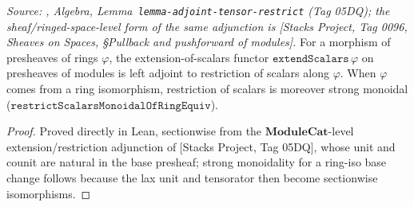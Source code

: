 \begin{lemma}
  \label{lem:extend_scalars_adjunction}
  \textit{Source: \cite{stacks-project}, Algebra, Lemma~\texttt{lemma-adjoint-tensor-restrict}
  (Tag 05DQ); the sheaf/ringed-space-level form of the same adjunction is
  [Stacks Project, Tag 0096, \emph{Sheaves on Spaces}, \S Pullback and pushforward of
  modules].}
  For a morphism of presheaves of rings \(\varphi\), the extension-of-scalars functor
  \(\mathtt{extendScalars}\,\varphi\) on presheaves of modules is left adjoint to
  restriction of scalars along \(\varphi\). When \(\varphi\) comes from a ring
  isomorphism, restriction of scalars is moreover strong monoidal
  (\(\mathtt{restrictScalarsMonoidalOfRingEquiv}\)).
\end{lemma}
\begin{proof}
  Proved directly in Lean, sectionwise from the \(\mathbf{ModuleCat}\)-level
  extension/restriction adjunction of [Stacks Project, Tag 05DQ], whose unit and counit
  are natural in the base presheaf; strong monoidality for a ring-iso base change
  follows because the lax unit and tensorator then become sectionwise isomorphisms.
\end{proof}

